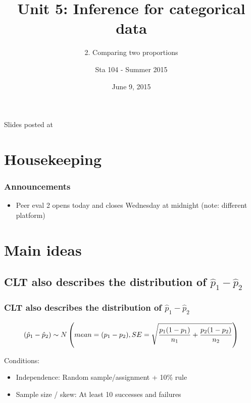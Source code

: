 \documentclass[slidestop,compress,mathserif,12pt,t,professionalfonts,xcolor=table]{beamer}
\title{Unit 5: Inference for categorical data}
\subtitle{2. Comparing two proportions}
\author{Sta 104 - Summer 2015}
\date{June 9, 2015}
\institute{Duke University, Department of Statistical Science}
\begin{document}



\begin{frame}[plain]

\titlepage
\vfill
{\scriptsize {} \hfill Slides posted at  \webLink{\CourseSite}{\CourseSite}}
\addtocounter{framenumber}{-1} 

\end{frame}


\section{Housekeeping}


\begin{frame}
\frametitle{Announcements}

\begin{itemize}

\item Peer eval 2 opens today and closes Wednesday at midnight (note: different platform)

\end{itemize}

\end{frame}


\section{Main ideas}


\subsection{CLT also describes the distribution of $\hat{p}_1 - \hat{p}_2$}
\label{mi1}


\begin{frame}
\frametitle{CLT also describes the distribution of $\hat{p}_1 - \hat{p}_2$}

\[ (\hat{p}_1 - \hat{p}_2) \sim N \left(  mean = (p_1 - p_2), SE = \sqrt{ \frac{p_1(1-p_1)}{n_1} + \frac{p_2(1-p_2)}{n_2} }  \right) \]

Conditions:
\begin{itemize}
\item Independence: Random sample/assignment + 10\% rule
\item Sample size / skew: At least 10 successes and failures
\end{itemize}

\end{frame}
\end{document}
